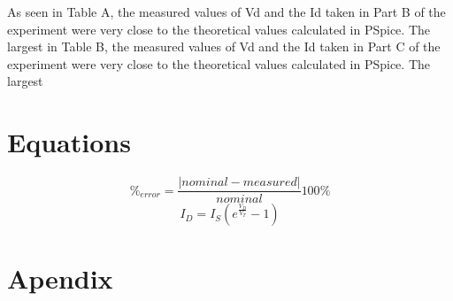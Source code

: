 \documentclass{article}
\begin{document}
As seen in Table A, the measured values of Vd and the Id taken in Part
B of the experiment were very close to the theoretical values
calculated in PSpice. The largest %
in Table B, the measured values of Vd and the Id taken in Part C of
the experiment were very close to the theoretical values calculated in
PSpice. The largest %

\section{Equations}
\label{sec:equations}

\begin{equation}
  \label{eqn:percent_err}
  \%_{error} = \frac{|nominal - measured|}{nominal}100\%
\end{equation}
%
\begin{equation}
  \label{eqn:schlockley}
  I_D = I_S \left(e^{\frac{V_D}{V_T}} - 1\right)
\end{equation}

\section{Apendix}
\label{sec:appendix}
\end{document}
